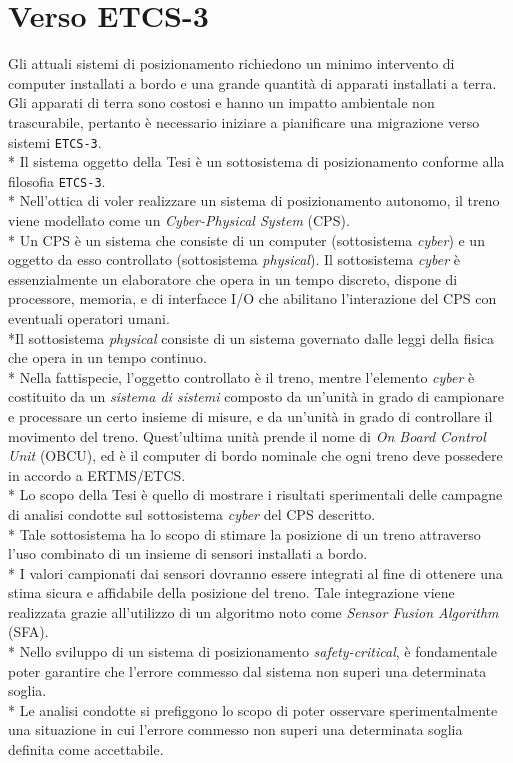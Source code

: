 \section{Verso ETCS-3}
Gli attuali sistemi di posizionamento richiedono un minimo intervento di computer installati a bordo e una grande quantit\`a di apparati installati a terra. Gli apparati di terra sono costosi e hanno un impatto ambientale non trascurabile, pertanto \`e necessario iniziare a pianificare una migrazione verso sistemi \texttt{ETCS-3}.\cite{market}\\*
Il sistema oggetto della Tesi \`e un sottosistema di posizionamento conforme alla filosofia \texttt{ETCS-3}.\\*
Nell'ottica di voler realizzare un sistema di posizionamento autonomo, il treno viene modellato come un \emph{Cyber-Physical System} (CPS).\\*
Un CPS \`e un sistema che consiste di un computer (sottosistema \emph{cyber}) e un oggetto da esso controllato (sottosistema \emph{physical}).
Il sottosistema \emph{cyber} \`e essenzialmente un elaboratore che opera in un tempo discreto, dispone di processore, memoria, e di interfacce I/O che abilitano l'interazione del CPS con eventuali operatori umani.\\*Il sottosistema \emph{physical} consiste di un sistema governato dalle leggi della fisica che opera in un tempo continuo.
\cite{cps}\cite{cecca}\\*
Nella fattispecie, l'oggetto controllato \`e il treno, mentre l'elemento \emph{cyber} \`e costituito da un \emph{sistema di sistemi} composto da un'unit\`a in grado di campionare e processare un certo insieme di misure, e da un'unit\`a in grado di controllare il movimento del treno. Quest'ultima unit\`a prende il nome di \emph{On Board Control Unit} (OBCU), ed \`e il computer di bordo nominale che ogni treno deve possedere in accordo a ERTMS/ETCS.\\*
Lo scopo della Tesi \`e quello di mostrare i risultati sperimentali delle campagne di analisi condotte sul sottosistema \emph{cyber} del CPS descritto.\\*
Tale sottosistema ha lo scopo di stimare la posizione di un treno attraverso l'uso combinato di un insieme di sensori installati a bordo.\\*
I valori campionati dai sensori dovranno essere integrati al fine di ottenere una stima sicura e affidabile della posizione del treno. Tale integrazione viene realizzata grazie all'utilizzo di un algoritmo noto come \emph{Sensor Fusion Algorithm} (SFA). \cite{sfarailway}\\*
Nello sviluppo di un sistema di posizionamento \emph{safety-critical}, \`e fondamentale poter garantire che l'errore commesso dal sistema non superi una determinata soglia.\\*
Le analisi condotte si prefiggono lo scopo di poter osservare sperimentalmente una situazione in cui l'errore commesso non superi una determinata soglia definita come accettabile.